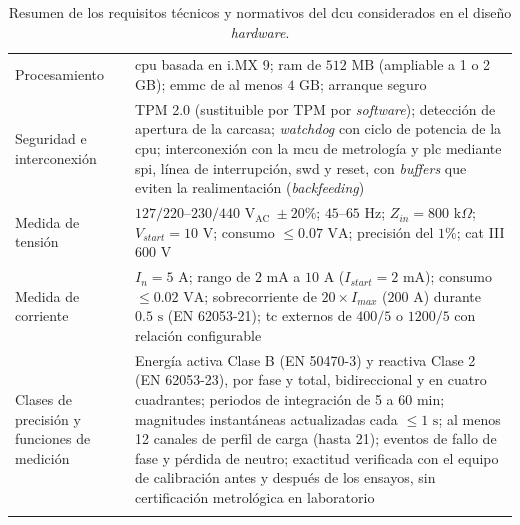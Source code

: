 \begin{longtable}{|>{\raggedright\arraybackslash}p{3.0cm}|>{\raggedright\arraybackslash}p{11.0cm}|}
\multicolumn{2}{|l|}{\textbf{E. Procesamiento, seguridad y metrología}} \\ \hline
Procesamiento & \gls{cpu} basada en i.MX 9; \gls{ram} de $512\text{ MB}$ (ampliable a 1 o 2 GB); \gls{emmc} de al menos $4\text{ GB}$; arranque seguro \\ \hline
Seguridad e interconexión & TPM 2.0 (sustituible por TPM por \textit{software}); detección de apertura de la carcasa; \textit{watchdog} con ciclo de potencia de la \gls{cpu}; interconexión con la \gls{mcu} de metrología y \gls{plc} mediante \gls{spi}, línea de interrupción, \gls{swd} y reset, con \textit{buffers} que eviten la realimentación (\textit{backfeeding}) \\ \hline
Medida de tensión & $127/220$--$230/440\text{ V}_{\text{AC}}\ \pm20\%$; $45$--$65\text{ Hz}$; $Z_{in}=800\text{ k}\Omega$; $V_{start}=10\text{ V}$; consumo $\le 0.07\text{ VA}$; precisión del $1\%$; \gls{cat} III 600 V \\ \hline
Medida de corriente & $I_n=5\text{ A}$; rango de $2\text{ mA}$ a $10\text{ A}$ ($I_{start}=2\text{ mA}$); consumo $\le 0.02\text{ VA}$; sobrecorriente de $20\times I_{max}$ ($200\text{ A}$) durante $0.5\text{ s}$ (EN 62053-21); \gls{tc} externos de $400/5$ o $1200/5$ con relación configurable \\ \hline
Clases de precisión y funciones de medición & Energía activa Clase B (EN 50470-3) y reactiva Clase 2 (EN 62053-23), por fase y total, bidireccional y en cuatro cuadrantes; periodos de integración de 5 a 60 min; magnitudes instantáneas actualizadas cada $\le 1\text{ s}$; al menos 12 canales de perfil de carga (hasta 21); eventos de fallo de fase y pérdida de neutro; exactitud verificada con el equipo de calibración antes y después de los ensayos, sin certificación metrológica en laboratorio \\ \hline

\caption{Resumen de los requisitos técnicos y normativos del \gls{dcu} considerados en el diseño \textit{hardware}.}
\label{tab:resumen_requisitos_dcu} \\
\end{longtable}
\endgroup

